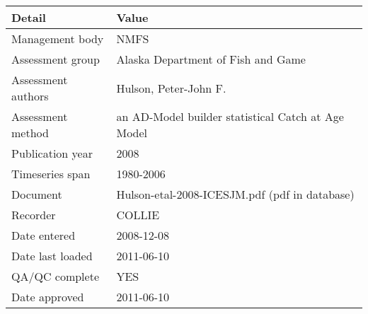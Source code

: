 \begin{table}[htb]
\centering
\begin{tabular}{lp{7cm}}
\toprule
Detail & Value \\
\midrule
Management body    & NMFS                                               \\
Assessment group   & Alaska Department of Fish and Game                 \\
Assessment authors & Hulson, Peter-John F.                              \\
Assessment method  & an AD-Model builder statistical Catch at Age Model \\
Publication year   & 2008                                               \\
Timeseries span    & 1980-2006                                          \\
Document           & Hulson-etal-2008-ICESJM.pdf (pdf in database)      \\
Recorder           & COLLIE                                             \\
Date entered       & 2008-12-08                                         \\
Date last loaded   & 2011-06-10                                         \\
QA/QC complete     & YES                                                \\
Date approved      & 2011-06-10                                         \\
\bottomrule
\end{tabular}
\label{tab:assessdet}
\end{table}
